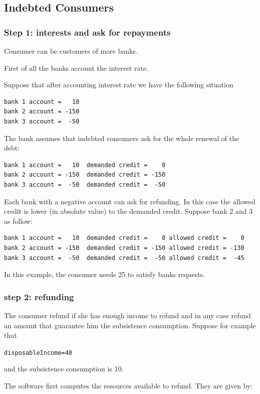 \documentclass{article}
\begin{document}
\subsection{Indebted Consumers}
\subsubsection*{Step 1: interests and ask for repayments}

Consumer can be customers of more banks.

First of all the banks account the interest rate.

Suppose that after accounting interest rate we have the following situation
\begin{verbatim}
bank 1 account =   10
bank 2 account = -150
bank 3 account =  -50
\end{verbatim}

The bank assumes that indebted consumers ask for the whole renewal of the debt:

\begin{verbatim}
bank 1 account =   10  demanded credit =    0
bank 2 account = -150  demanded credit = -150
bank 3 account =  -50  demanded credit =  -50
\end{verbatim}

Each bank with a negative account can ask for refunding. In this case the allowed credit is lower (in absolute value) to the demanded credit.
Suppose bank 2 and 3 as follow:

\begin{verbatim}
bank 1 account =   10  demanded credit =    0 allowed credit =    0
bank 2 account = -150  demanded credit = -150 allowed credit = -130 
bank 3 account =  -50  demanded credit =  -50 allowed credit =  -45
\end{verbatim}

In this example, the consumer needs 25 to satisfy banks requests.

\subsubsection*{step 2: refunding}
The consumer refund if she has enough income to refund and in any case refund an amount that guarantee him the subsistence consumption. Suppose for example that

\verb+disposableIncome=40+

and the subsistence consumption is 10.

The software first computes the resources available to refund. They are given by:
\end{document}
